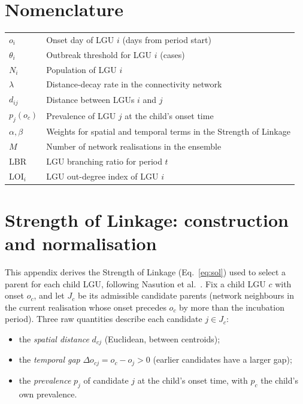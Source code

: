 \documentclass[a4paper,11pt]{article}
\begin{document}
\section*{Nomenclature}
\begin{tabular}{ll}
$o_i$ & Onset day of LGU $i$ (days from period start) \\
$\theta_i$ & Outbreak threshold for LGU $i$ (cases) \\
$N_i$ & Population of LGU $i$ \\
$\lambda$ & Distance-decay rate in the connectivity network \\
$d_{ij}$ & Distance between LGUs $i$ and $j$ \\
$p_j(o_c)$ & Prevalence of LGU $j$ at the child's onset time \\
$\alpha,\beta$ & Weights for spatial and temporal terms in the Strength of Linkage \\
$M$ & Number of network realisations in the ensemble \\
$\mathrm{LBR}$ & LGU branching ratio for period $t$ \\
$\mathrm{LOI}_i$ & LGU out-degree index of LGU $i$ \\
\end{tabular}

\appendix
\section{Strength of Linkage: construction and normalisation}
\label{app:sol}
This appendix derives the Strength of Linkage (Eq.~\ref{eq:sol}) used to select a
parent for each child LGU, following Nasution et al.\ \cite{Nasution2024}. Fix a
child LGU $c$ with onset $o_c$, and let $J_c$ be its admissible candidate parents
(network neighbours in the current realisation whose onset precedes $o_c$ by more
than the incubation period). Three raw quantities describe each candidate
$j\in J_c$:
\begin{itemize}
\item the \emph{spatial distance} $d_{cj}$ (Euclidean, between centroids);
\item the \emph{temporal gap} $\Delta o_{cj}=o_c-o_j>0$ (earlier candidates have a
larger gap);
\item the \emph{prevalence} $p_j$ of candidate $j$ at the child's onset time, with
$p_c$ the child's own prevalence.
\end{itemize}
\end{document}
